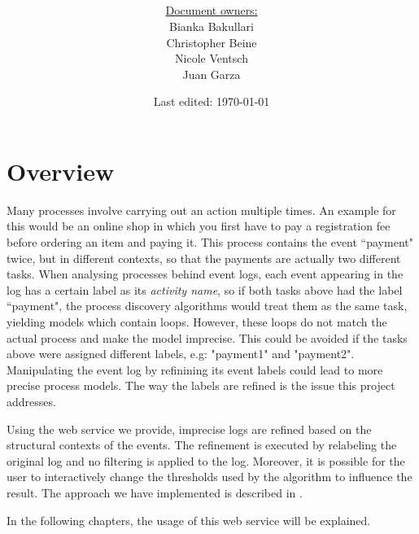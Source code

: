 \documentclass[notitlepage]{article}
\title{%
	\documentName\text{ } \\
  \large \projectName\text{ } \\
  }
\author{
	\large \underline{Document owners:}\\ 
	Bianka Bakullari\\
	\texttt{}
	Christopher Beine\\
	\texttt{}
	Nicole Ventsch\\
	\texttt{}
	Juan Garza\\
	\texttt{}
}
\date{\small{Last edited: \today}}
\begin{document}
\begin{titlepage}
\clearpage\maketitle			%
\thispagestyle{fancy}
\tableofcontents
\end{titlepage}

\rfoot{\thepage}				%



\section{Overview}

Many processes involve carrying out an action multiple times. 
An example for this would be an online shop in which you first have to pay a registration fee before ordering an item and paying it. 
This process contains the event “payment" twice, but in different contexts, so that the payments are actually two different tasks. 
When analysing processes behind event logs, each event appearing in the log has a certain label as its \textit{activity name}, so if both tasks above had the label “payment", the process discovery algorithms would treat them as the same task, yielding models which contain loops. 
However, these loops do not match the actual process and make the model imprecise.
This could be avoided if the tasks above were assigned different labels, e.g: "payment1" and "payment2".
Manipulating the event log by refinining its event labels could lead to more precise process models. 
The way the labels are refined is the issue this project addresses.

Using the web service we provide, imprecise logs are refined based on the structural contexts of the events. 
The refinement is executed by relabeling the original log and no filtering is applied to the log. 
Moreover, it is possible for the user to interactively change the thresholds used by the algorithm to influence the result. 
The approach we have implemented is described in \cite{paper}.

In the following chapters, the usage of this web service will be explained.
\end{document}
